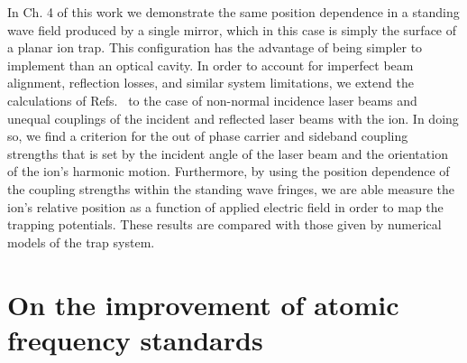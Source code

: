 In Ch. 4 of this work we demonstrate the same position dependence in a standing wave field produced by a single mirror, which in this case is simply the surface of a planar ion trap. This configuration has the advantage of being simpler to implement than an optical cavity. In order to account for imperfect beam alignment, reflection losses, and similar system limitations, we extend the calculations of Refs.~\cite{Cirac92.PRA.46.2668,James98.APB.66.181} to the case of non-normal incidence laser beams and unequal couplings of the incident and reflected laser beams with the ion. In doing so, we find a criterion for the out of phase carrier and sideband coupling strengths that is set by the incident angle of the laser beam and the orientation of the ion's harmonic motion. Furthermore, by using the position dependence of the coupling strengths within the standing wave fringes, we are able measure the ion's relative position as a function of applied electric field in order to map the trapping potentials. These results are compared with those given by numerical models of the trap system.

\section{On the improvement of atomic frequency standards}

